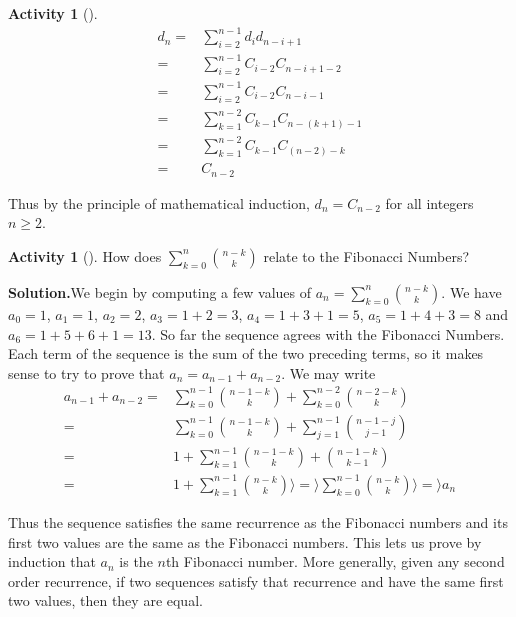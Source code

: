 \documentclass[10pt,]{book}
\theoremstyle{plain}
\theoremstyle{definition}
\newtheorem{activity}[project]{Activity}
\numberwithin{equation}{chapter}
\newcommand{\amp}{&}
\begin{document}
\begin{activity}[]
\begin{align*}
d_n =\amp \sum\limits_{i=2}^{n-1} d_id_{n-i+1}\\
=\amp \sum\limits_{i=2}^{n-1} C_{i-2}C_{n-i+1-2}\\
=\amp \sum\limits_{i=2}^{n-1} C_{i-2}C_{n-i-1}\\
=\amp \sum\limits_{k=1}^{n-2} C_{k-1}C_{n-(k+1)-1}\\
=\amp \sum\limits_{k=1}^{n-2} C_{k-1}C_{(n-2)-k}\\
=\amp C_{n-2}
\end{align*}
%
\par
Thus by the principle of mathematical induction, \(d_n=C_{n-2}\) for all integers \(n\ge 2\).%
\end{activity}
\begin{activity}[]\label{activity-216}
How does \(\sum_{k=0}^n\binom{n-k}{k}\) relate to the Fibonacci Numbers?%
\par\medskip\noindent%
\textbf{Solution.}\quad We begin by computing a few values of \(a_n=\sum_{k=0}^n\binom{n-k}{k}\). We have \(a_0=1\), \(a_1=1\), \(a_2=2\), \(a_3=1+2=3\), \(a_4=1+3+1=5\), \(a_5=1+4+3=8\) and \(a_6=1+5+6+1=13\). So far the sequence agrees with the Fibonacci Numbers. Each term of the sequence is the sum of the two preceding terms, so it makes sense to try to prove that \(a_n=a_{n-1}+a_{n-2}\). We may write%
\begin{align*}
a_{n-1}+a_{n-2}
=\amp \sum_{k=0}^{n-1} \binom{n-1-k}{k}
+\sum_{k=0}^{n-2} \binom{n-2-k}{k}\\
=\amp \sum_{k=0}^{n-1} \binom{n-1-k}{k}+\sum_{j=1}^{n-1}\binom{n-1-j}{j-1}\\
=\amp 1+\sum_{k=1}^{n-1}\binom{n-1-k}{k}+\binom{n-1-k}{k-1}\\
=\amp 1+\sum_{k=1}^{n-1}\binom{n-k}{k} \rangle =\rangle  \sum_{k=0}^{n-1}\binom{n-k}{k}
\rangle =\rangle  a_n
\end{align*}
%
\par
Thus the sequence satisfies the same recurrence as the Fibonacci numbers and its first two values are the same as the Fibonacci numbers. This lets us prove by induction that \(a_n\) is the \(n\)th Fibonacci number. More generally, given any second order recurrence, if two sequences satisfy that recurrence and have the same first two values, then they are equal.%
\end{activity}
\end{document}
